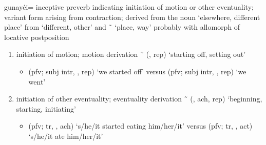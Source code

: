 \documentclass[12pt,letterpaper,oneside,article]{memoir}
\begin{document}
\begin{morphdesc}[resume*=alphalist]
\item[g̱unayéi=]
	inceptive preverb indicating initiation of motion or other eventuality;
	variant form  arising from contraction;
	derived from the noun  ‘elsewhere, different place’
		from  ‘different, other’
		and  \~\  ‘place, way’
		probably with  allomorph of  locative postposition
	\begin{enumerate}
	\item	initiation of motion;
		motion derivation
			 \~\  (,  rep) ‘starting off, setting out’
		\begin{itemize}
		\item	{} (pfv; subj intr, ,  rep) ‘we started off’\newline
			versus  (pfv; subj intr, ,  rep) ‘we went’
		\end{itemize}
	\item	initiation of other eventuality;
		eventuality derivation
			 \~\  (, ach,  rep)
				‘beginning, starting, initiating’
		\begin{itemize}
		\item	{} (pfv; tr, , ach) ‘s/he/it started eating him/her/it’\newline
			versus  (pfv; tr, ,  act) ‘s/he/it ate him/her/it’
		\end{itemize}
	\end{enumerate}
\end{morphdesc}
\end{document}
